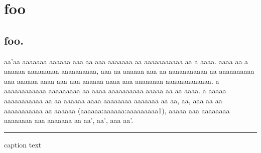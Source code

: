 \documentclass[12pt,openany]{memoir}
\newcommand{\imageCentered}[4]{%
\begin{center}%
   \captionsetup{type=figure}%
\rule{350pt}{300pt} \par
   \caption{#2}%
   \label{#3}%
\end{center}%
}
\begin{document}


\chapter{foo}
\section{foo.}

aa'aa aaaaaaa aaaaaa aaa aa aaa aaaaaaa aa aaaaaaaaaaa aa a aaaa.  aaaa aa a aaaaaa aaaaaaaaa aaaaaaaaaa, aaa aa aaaaaa aaa aa aaaaaaaaaaa aa aaaaaaaaaa aaa aaaaaa aaaa aaa aaa aaaaaa aaaa aaa aaaaaaaa aaaaaaaaaaaaa.  a aaaaaaaaaaaa aaaaaaaaa aa aaaa aaaaaaaaaa aaaaa aa aa aaaa.  a aaaaa aaaaaaaaaaa aa aa aaaaaa aaaa aaaaaaaa aaaaaaa aa aa, aa, aaa aa aa aaaaaaaaaaa aa aaaaaa (aaa{aaa:aaaaaa:aaaaaaaaa1}), aaaaa aaa aaaaaaaa aaaaaaaa aaa aaaaaaa aa aa', aa', aaa aa'.

\imageCentered{figures/strainFig1}{caption text}{fig:1}{0.5}
\end{document}
